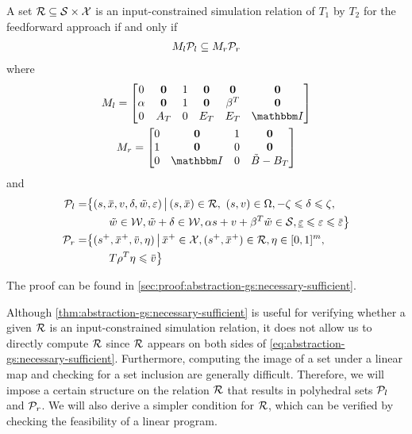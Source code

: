 \begin{theorem}
  \label{thm:abstraction-gs:necessary-sufficient}
  A set $\mathcal{R} \subseteq \mathcal{S} \times \mathcal{X}$ is an input-constrained simulation relation of $T_{1}$ by $T_{2}$ for the feedforward approach if and only if
  \begin{align}
    \label{eq:abstraction-gs:necessary-sufficient}
    M_l \mathcal{P}_l \subseteq M_r \mathcal{P}_r
  \end{align}
  where 
  \begin{gather*}
    M_l =
          \begin{bmatrix}
            0 & \Zero & 1 & \Zero & \Zero & \Zero \\
            \alpha & \Zero & 1 & \Zero & \beta^{T} & \Zero \\
            0 & A_T & 0 & E_T & E_T & \IdentityMatrix
          \end{bmatrix}\\
    M_r =
      \begin{bmatrix}
        0 & \Zero & 1 & \Zero \\
        1 & \Zero & 0 & \Zero \\
        0 & \IdentityMatrix & 0 & \tilde{B} - B_{T}
      \end{bmatrix}
  \end{gather*}
  and
  \begin{align*}
    \PSet_l =& \big\{ (s,\overbar{x}, v, \delta, \tilde{w}, \varepsilon) \,\big|\,
              (s,\overbar{x}) \in \RSet,\ (s,v) \in \Omega, -\zeta \leqslant \delta \leqslant \zeta,\big.\\
            &\qquad \big. \tilde{w} \in \WSet, \tilde{w} + \delta \in \WSet, \alpha s + v + \beta^{T} \tilde{w} \in \SSet, \underline{\varepsilon} \leqslant \varepsilon \leqslant \overbar{\varepsilon} \big\} \\
    \PSet_r =& \big\{(s^+, \overbar{x}^{+}, \overbar{v}, \eta) \,\big|\,
               \overbar{x}^{+} \in \XSet, (s^{+}, \overbar{x}^{+}) \in \RSet, \eta \in [0,1]^{m},\big.\\
             &\qquad \big. T \rho^{T} \eta \leqslant \overbar{v}\big\}
  \end{align*}
\end{theorem}
The proof can be found in \cref{sec:proof:abstraction-gs:necessary-sufficient}.

Although \cref{thm:abstraction-gs:necessary-sufficient} is useful for verifying whether a given $\mathcal{R}$ is an input-constrained simulation relation, it does not allow us to directly compute $\mathcal{R}$ since $\mathcal{R}$ appears on both sides of \eqref{eq:abstraction-gs:necessary-sufficient}.
Furthermore, computing the image of a set under a linear map and checking for a set inclusion are generally difficult.
Therefore, we will impose a certain structure on the relation $\mathcal{R}$ that results in polyhedral sets $\mathcal{P}_{l}$ and $\mathcal{P}_{r}$.
We will also derive a simpler condition for $\mathcal{R}$, which can be verified by checking the feasibility of a linear program.

